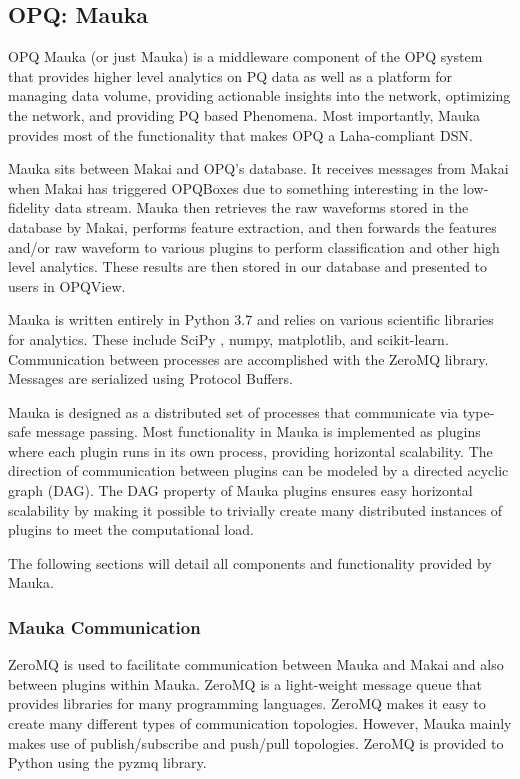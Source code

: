 \subsection{OPQ: Mauka}
OPQ Mauka (or just Mauka) is a middleware component of the OPQ system that provides higher level analytics on PQ data as well as a platform for managing data volume, providing actionable insights into the network, optimizing the network, and providing PQ based Phenomena. Most importantly, Mauka provides most of the functionality that makes OPQ a Laha-compliant DSN.

Mauka sits between Makai and OPQ's database. It receives messages from Makai when Makai has triggered OPQBoxes due to something interesting in the low-fidelity data stream. Mauka then retrieves the raw waveforms stored in the database by Makai, performs feature extraction, and then forwards the features and/or raw waveform to various plugins to perform classification and other high level analytics. These results are then stored in our database and presented to users in OPQView.

Mauka is written entirely in Python 3.7\cite{python:2019} and relies on various scientific libraries for analytics. These include SciPy \cite{scipy:2019}, numpy\cite{numpy}, matplotlib\cite{matplotlib}, and scikit-learn\cite{scikitlearn}. Communication between processes are accomplished with the ZeroMQ\cite{zmq} library. Messages are serialized using Protocol Buffers\cite{protobuf}.

Mauka is designed as a distributed set of processes that communicate via type-safe message passing. Most functionality in Mauka is implemented as plugins where each plugin runs in its own process, providing horizontal scalability. The direction of communication between plugins can be modeled by a directed acyclic graph (DAG). The DAG property of Mauka plugins ensures easy horizontal scalability by making it possible to trivially create many distributed instances of plugins to meet the computational load. 

The following sections will detail all components and functionality provided by Mauka.

\subsubsection{Mauka Communication}
ZeroMQ is used to facilitate communication between Mauka and Makai and also between plugins within Mauka. ZeroMQ is a light-weight message queue that provides libraries for many programming languages. ZeroMQ makes it easy to create many different types of communication topologies. However, Mauka mainly makes use of publish/subscribe and push/pull topologies. ZeroMQ is provided to Python using the pyzmq library.

